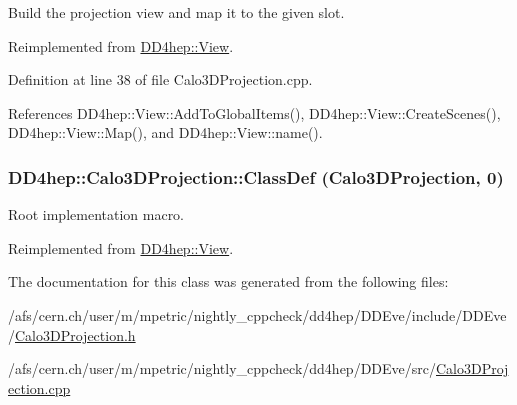 Build the projection view and map it to the given slot. 

Reimplemented from \hyperlink{class_d_d4hep_1_1_view_ab4e12874a9cb6a599f268b027443c6ce}{DD4hep::View}.

Definition at line 38 of file Calo3DProjection.cpp.

References DD4hep::View::AddToGlobalItems(), DD4hep::View::CreateScenes(), DD4hep::View::Map(), and DD4hep::View::name().\hypertarget{class_d_d4hep_1_1_calo3_d_projection_a4696a6c764ceaf1307e6459c24cd7d1f}{
\subsubsection[{ClassDef}]{\setlength{\rightskip}{0pt plus 5cm}DD4hep::Calo3DProjection::ClassDef ({\bf Calo3DProjection}, \/  0)}}
\label{class_d_d4hep_1_1_calo3_d_projection_a4696a6c764ceaf1307e6459c24cd7d1f}


Root implementation macro. 

Reimplemented from \hyperlink{class_d_d4hep_1_1_view_a35dcb8a29c90f0adeba81ad4215be551}{DD4hep::View}.

The documentation for this class was generated from the following files:\begin{DoxyCompactItemize}
\item 
/afs/cern.ch/user/m/mpetric/nightly\_\-cppcheck/dd4hep/DDEve/include/DDEve/\hyperlink{_calo3_d_projection_8h}{Calo3DProjection.h}\item 
/afs/cern.ch/user/m/mpetric/nightly\_\-cppcheck/dd4hep/DDEve/src/\hyperlink{_calo3_d_projection_8cpp}{Calo3DProjection.cpp}\end{DoxyCompactItemize}
